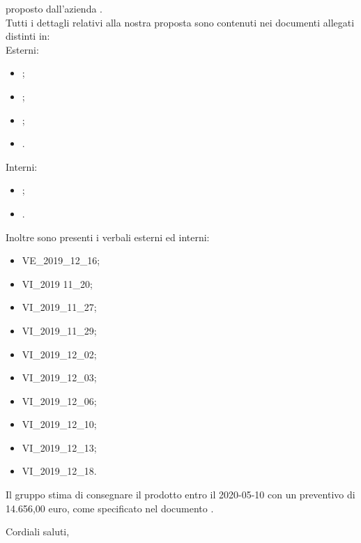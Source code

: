 \documentclass[12pt]{letter}
\begin{document}
\begin{letter}
\begin{center}
        \end{center}
        proposto dall'azienda \textbf{\Proponente{}}.\\
        Tutti i dettagli relativi alla nostra proposta sono contenuti nei documenti allegati distinti in: \\
        Esterni: 
        \begin{itemize}
            \item {};
            \item {};
            \item {};
            \item {}.
        \end{itemize}
        Interni:
        \begin{itemize}
            \item {};
            \item {}.
        \end{itemize}
        Inoltre sono presenti i verbali esterni ed interni:
        \begin{itemize}
            \item VE\_2019\_12\_16;
            \item VI\_2019 11\_20;
            \item VI\_2019\_11\_27;
            \item VI\_2019\_11\_29;
            \item VI\_2019\_12\_02;
            \item VI\_2019\_12\_03;
            \item VI\_2019\_12\_06;
            \item VI\_2019\_12\_10;
            \item VI\_2019\_12\_13;
            \item VI\_2019\_12\_18.
        \end{itemize}
        Il gruppo stima di consegnare il prodotto entro il 2020-05-10 con un preventivo di 14.656,00 euro, come specificato nel documento .
        \closing{Cordiali saluti,}
        \vspace{10mm}
    \end{letter}
\end{document}
